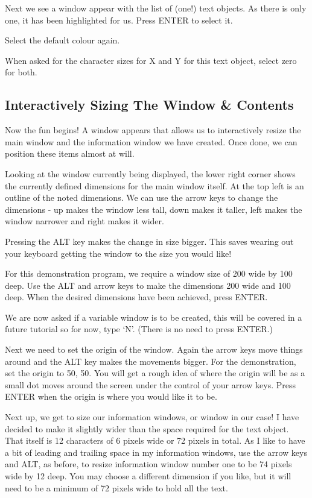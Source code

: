 Next we see a window appear with the list of (one!) text objects. As
            there is only one, it has been highlighted for us. Press ENTER to select
            it.

Select the default colour again.

When asked for the character sizes for X and Y for this text object,
            select zero for both.

\subsection{Interactively Sizing The Window \& Contents}

Now the fun begins! A window appears that allows us to interactively
            resize the main window and the information window we have created. Once done,
            we can position these items almost at will.

Looking at the window currently being displayed, the lower right corner
            shows the currently defined dimensions for the main window itself. At the top
            left is an outline of the noted dimensions. We can use the arrow keys to
            change the dimensions -{} up makes the window less tall, down makes it taller,
            left makes the window narrower and right makes it wider.

Pressing the ALT key makes the change in size bigger. This saves wearing
            out your keyboard getting the window to the size you would like!

For this demonstration program, we require a window size of 200 wide by
            100 deep. Use the ALT and arrow keys to make the dimensions 200 wide and 100
            deep. When the desired dimensions have been achieved, press ENTER.

We are now asked if a variable window is to be created, this will be
            covered in a future tutorial so for now, type `N'. (There is no need to press
            ENTER.)

Next we need to set the origin of the window. Again the arrow keys move
            things around and the ALT key makes the movements bigger. For the
            demonstration, set the origin to 50, 50. You will get a rough idea of where
            the origin will be as a small dot moves around the screen under the control of
            your arrow keys. Press ENTER when the origin is where you would like it to
            be.

Next up, we get to size our information windows, or window in our case!
            I have decided to make it slightly wider than the space required for the text
            object. That itself is 12 characters of 6 pixels wide or 72 pixels in total.
            As I like to have a bit of leading and trailing space in my information
            windows, use the arrow keys and ALT, as before, to resize information window
            number one to be 74 pixels wide by 12 deep. You may choose a different
            dimension if you like, but it will need to be a minimum of 72 pixels wide to
            hold all the text.

